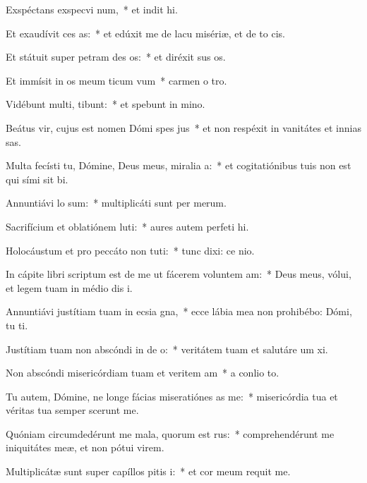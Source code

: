 \item Exspéctans exspecvi num,~* et indit hi.
\item Et exaudívit ces as:~* et edúxit me de lacu misériæ, et de to cis.
\item Et státuit super petram des os:~* et diréxit sus os.
\item Et immísit in os meum ticum vum~* carmen o tro.
\item Vidébunt multi,  tibunt:~* et spebunt in mino.
\item Beátus vir, cujus est nomen Dómi spes jus~* et non respéxit in vanitátes et innias sas.
\item Multa fecísti tu, Dómine, Deus meus, miralia a:~* et cogitatiónibus tuis non est qui sími sit bi.
\item Annuntiávi  lo sum:~* multiplicáti sunt per merum.
\item Sacrifícium et oblatiónem luti:~* aures autem perfeti hi.
\item Holocáustum et pro peccáto non tuti:~* tunc dixi: ce nio.
\item In cápite libri scriptum est de me ut fácerem voluntem am:~* Deus meus, vólui, et legem tuam in médio dis i.
\item Annuntiávi justítiam tuam in ecsia gna,~* ecce lábia mea non prohibébo: Dómi, tu ti.
\item Justítiam tuam non abscóndi in de o:~* veritátem tuam et salutáre um xi.
\item Non abscóndi misericórdiam tuam et veritem am~* a conlio to.
\item Tu autem, Dómine, ne longe fácias miseratiónes as  me:~* misericórdia tua et véritas tua semper scerunt me.
\item Quóniam circumdedérunt me mala, quorum  est rus:~* comprehendérunt me iniquitátes meæ, et non pótui  virem.
\item Multiplicátæ sunt super capíllos pitis i:~* et cor meum requit me.
